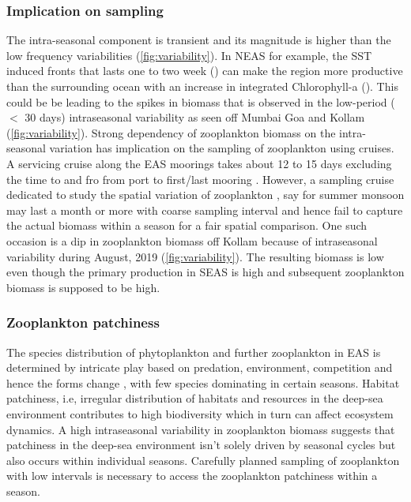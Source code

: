\documentclass{article}
\begin{document}
    \subsubsection{Implication on sampling}
    The intra-seasonal component is transient and its magnitude is higher than the low frequency variabilities (\cref{fig:variability}). In NEAS for example, the SST induced fronts that lasts one to two week (\citep{sarma2018ecosystem,sarkar2019seasonal}) can make the region more productive than the surrounding ocean with an increase in integrated Chlorophyll-a (\citep{sarma2018ecosystem}). This could be be leading to the spikes in biomass that is observed in the low-period ($<$ 30 days) intraseasonal variability as seen off Mumbai Goa and Kollam (\cref{fig:variability}). Strong dependency of zooplankton biomass on the intra-seasonal variation has implication on the sampling of zooplankton using cruises. A servicing cruise along the EAS moorings takes about 12 to 15 days excluding the time to and fro from port to first/last mooring \citep{ chaudhuri2020observed, aparna2022seasonal}. However, a sampling cruise dedicated to study the spatial variation of zooplankton \citep{madhupratap1992zooplankton,smith1998seasonal,wishner1998mesozooplankton, kidwai2000dd}, say for summer monsoon may last a month or more with coarse sampling interval and hence fail to capture the actual biomass within a season for a fair spatial comparison. One such occasion is a dip in zooplankton biomass off Kollam because of intraseasonal variability during August, 2019 (\cref{fig:variability}). The resulting biomass is low even though the primary production in SEAS \citep{ashadevi20101070, jyothibabu2010re} is high and subsequent zooplankton biomass is supposed to be high. 
    
 
    \subsubsection{Zooplankton patchiness}
 	The species distribution of phytoplankton and further zooplankton in EAS is determined by intricate play based on predation, environment, competition \citep{raghukumar2003marine} and hence the forms change \citep{madhupratap1996lack,kidwai2000dd,raghukumar2003marine, smith2005mesozooplankton,khandagale2022seasonal}, with few species dominating in certain seasons. Habitat patchiness, i.e, irregular distribution of habitats and resources in the deep-sea environment \citep{eggleston1998organism,raghukumar2003marine} contributes to high biodiversity which in turn can affect ecosystem dynamics. A high intraseasonal variability in zooplankton biomass suggests that patchiness in the deep-sea environment isn't solely driven by seasonal cycles but also occurs within individual seasons. Carefully planned sampling of zooplankton with low intervals is necessary to access the zooplankton patchiness within a season. 
 	
\end{document}
